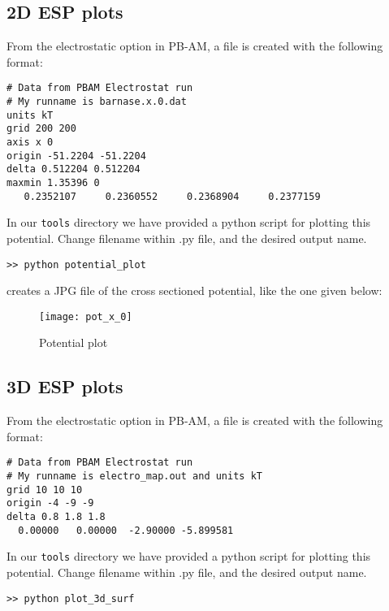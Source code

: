 \subsection{2D ESP plots}
From the electrostatic option in PB-AM, a file is created with the following format: \\

\begin{lstlisting}[style = MyBash]
# Data from PBAM Electrostat run
# My runname is barnase.x.0.dat
units kT
grid 200 200 
axis x 0 
origin -51.2204 -51.2204
delta 0.512204 0.512204
maxmin 1.35396 0
   0.2352107     0.2360552     0.2368904     0.2377159
\end{lstlisting}

\medskip

In our \texttt{tools} directory we have provided a python script for plotting this potential.
Change filename within .py file, and the desired output name.
\begin{lstlisting}[style = MyBash]
>> python potential_plot
\end{lstlisting}

\medskip

creates a JPG file of the cross sectioned potential, like the one given below:

\begin{figure}[!htbp]
  \centering
    \texttt{[image: pot\_x\_0]}
    \caption{Potential plot}
\end{figure}

\subsection{3D ESP plots}
From the electrostatic option in PB-AM, a file is created with the following format: \\

\begin{lstlisting}[style = MyBash]
# Data from PBAM Electrostat run
# My runname is electro_map.out and units kT
grid 10 10 10
origin -4 -9 -9
delta 0.8 1.8 1.8
  0.00000   0.00000  -2.90000 -5.899581 
\end{lstlisting}

\medskip

In our \texttt{tools} directory we have provided a python script for plotting this potential.
Change filename within .py file, and the desired output name.
\begin{lstlisting}[style = MyBash]
>> python plot_3d_surf
\end{lstlisting}

